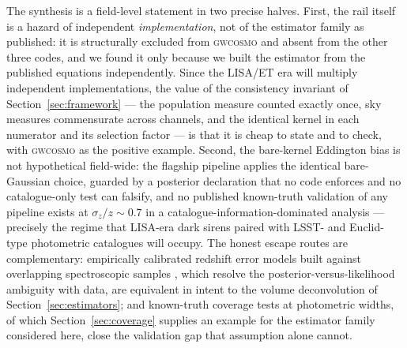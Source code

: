 The synthesis is a field-level statement in two precise halves. First, the rail itself is a hazard of independent \emph{implementation}, not of the estimator family as published: it is structurally excluded from \textsc{gwcosmo} and absent from the other three codes, and we found it only because we built the estimator from the published equations independently. Since the LISA/ET era will multiply independent implementations, the value of the consistency invariant of Section~\ref{sec:framework} --- the population measure counted exactly once, sky measures commensurate across channels, and the identical kernel in each numerator and its selection factor --- is that it is cheap to state and to check, with \textsc{gwcosmo} as the positive example. %
Second, the bare-kernel Eddington bias is not hypothetical field-wide: the flagship pipeline applies the identical bare-Gaussian choice, guarded by a posterior declaration that no code enforces and no catalogue-only test can falsify, and no published known-truth validation of any pipeline exists at $\sigma_z/z \sim 0.7$ in a catalogue-information-dominated analysis --- precisely the regime that LISA-era dark sirens paired with LSST- and Euclid-type photometric catalogues will occupy. %
The honest escape routes are complementary: empirically calibrated redshift error models built against overlapping spectroscopic samples \citep{Turski:2023lxq}, which resolve the posterior-versus-likelihood ambiguity with data, are equivalent in intent to the volume deconvolution of Section~\ref{sec:estimators}; and known-truth coverage tests at photometric widths, of which Section~\ref{sec:coverage} supplies an example for the estimator family considered here, close the validation gap that assumption alone cannot. %

